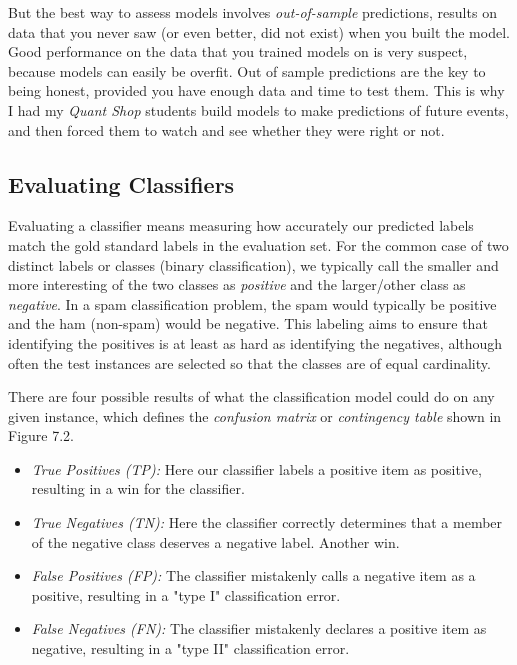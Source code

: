 \documentclass[10pt]{article}
\begin{document}
But the best way to assess models involves \textit{out-of-sample} predictions, results on data that you never saw (or even better, did not exist) when you built the model. Good performance on the data that you trained models on is very suspect, because models can easily be overfit. Out of sample predictions are the key to being honest, provided you have enough data and time to test them. This is why I had my \textit{Quant Shop} students build models to make predictions of future events, and then forced them to watch and see whether they were right or not.

\subsection{Evaluating Classifiers}
Evaluating a classifier means measuring how accurately our predicted labels match the gold standard labels in the evaluation set. For the common case of two distinct labels or classes (binary classification), we typically call the smaller and more interesting of the two classes as \textit{positive} and the larger/other class as \textit{negative}. In a spam classification problem, the spam would typically be positive and the ham (non-spam) would be negative. This labeling aims to ensure that identifying the positives is at least as hard as identifying the negatives, although often the test instances are selected so that the classes are of equal cardinality.

There are four possible results of what the classification model could do on any given instance, which defines the \textit{confusion matrix} or \textit{contingency table} shown in Figure 7.2.

\begin{itemize}
  \item \textit{True Positives (TP):} Here our classifier labels a positive item as positive, resulting in a win for the classifier.
  \item \textit{True Negatives (TN):} Here the classifier correctly determines that a member of the negative class deserves a negative label. Another win.
  \item \textit{False Positives (FP):} The classifier mistakenly calls a negative item as a positive, resulting in a "type I" classification error.
  \item \textit{False Negatives (FN):} The classifier mistakenly declares a positive item as negative, resulting in a "type II" classification error.
\end{itemize}
\end{document}
